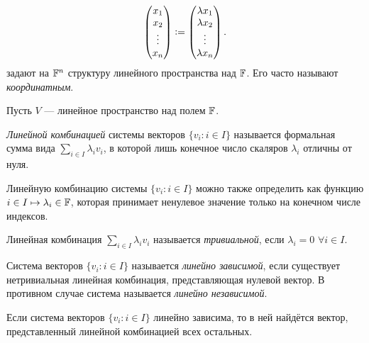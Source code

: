 \begin{example}
\begin{enumerate}
\[                \begin{pmatrix}
                    x_1\\
                    x_2\\
                    \vdots\\
                    x_n
                \end{pmatrix} \vcentcolon=
                \begin{pmatrix}
                    \lambda x_1\\
                    \lambda x_2\\
                    \vdots\\
                    \lambda x_n
                \end{pmatrix}.
            \]
            задают на $\mathbb{F}^n$ структуру линейного пространства над $\mathbb{F}$. Его часто называют \textit{координатным}.
    \end{enumerate}
\end{example}

Пусть $V$ --- линейное пространство над полем $\mathbb{F}$.

\begin{definition}
    \textit{Линейной комбинацией} системы векторов $\{v_i: i \in I\}$ называется формальная сумма вида $\sum\limits_{i \in I}\lambda_iv_i$, в которой лишь конечное число скаляров $\lambda_i$ отличны от нуля.
\end{definition}

\begin{remark}
    Линейную комбинацию системы $\{v_i : i \in I\}$ можно также определить как функцию $i \in I \mapsto \lambda_i \in \mathbb{F}$, которая принимает ненулевое значение только на конечном числе индексов.
\end{remark}

\begin{definition}
    Линейная комбинация $\sum\limits_{i \in I}\lambda_iv_i$ называется \textit{тривиальной}, если $\lambda_i = 0$ $\forall i \in I$.
\end{definition}

\begin{definition}
    Система векторов $\{v_i : i \in I\}$ называется \textit{линейно зависимой}, если существует нетривиальная линейная комбинация, представляющая нулевой вектор. В противном случае система называется \textit{линейно независимой}.
\end{definition}

\begin{lemma}
    Если система векторов $\{v_i : i \in I\}$ линейно зависима, то в ней найдётся вектор, представленный линейной комбинацией всех остальных.
\end{lemma}

